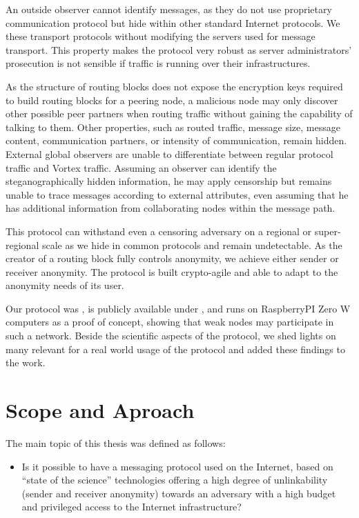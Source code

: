 An outside observer cannot identify messages, as they do not use proprietary communication protocol but hide within other standard Internet protocols. We  these transport protocols without modifying the servers used for message transport. This property makes the protocol very robust as server administrators' prosecution is not sensible if traffic is running over their infrastructures. 

As the structure of routing blocks does not expose the encryption keys required to build routing blocks for a peering node, a malicious node may only discover other possible peer partners when routing traffic without gaining the capability of talking to them. Other properties, such as routed traffic, message size, message content, communication partners, or intensity of communication, remain hidden. External global observers are unable to differentiate between regular protocol traffic and Vortex traffic. Assuming an observer can identify the steganographically hidden information, he may apply censorship but remains unable to trace messages according to external attributes, even assuming that he has additional information from collaborating nodes within the message path.

This protocol can withstand even a censoring adversary on a regional or super-regional scale as we hide in common protocols and remain undetectable. As the creator of a routing block fully controls anonymity, we achieve either sender or receiver anonymity. The protocol is built crypto-agile and able to adapt to the anonymity needs of its user.

Our protocol was , is publicly available under \href{https://messagevortex.net/}, and runs on RaspberryPI Zero W computers as a proof of concept, showing that weak nodes may participate in such a network. Beside the scientific aspects of the protocol, we shed lights on many  relevant for a real world usage of the protocol and added these findings to the work.

\chapter{Scope and Aproach}
The main topic of this thesis was defined as follows:

\begin{itemize}
	\item Is it possible to have a messaging protocol used on the Internet, based on ``state of the science'' technologies offering a high degree of unlinkability (sender and receiver anonymity) towards an adversary with a high budget and privileged access to the Internet infrastructure?
\end{itemize}


